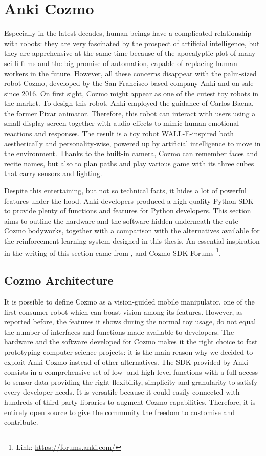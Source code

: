 \section{Anki Cozmo}

Especially in the latest decades, human beings have a complicated relationship with robots: they are very fascinated by the prospect of artificial intelligence, but they are apprehensive at the same time because of the apocalyptic plot of many sci-fi films and the big promise of automation, capable of replacing human workers in the future.
However, all these concerns disappear with the palm-sized robot Cozmo, developed by the San Francisco-based company Anki and on sale since 2016.
On first sight, Cozmo might appear as one of the cutest toy robots in the market. To design this robot, Anki employed the guidance of Carlos Baena, the former Pixar animator. 
Therefore, this robot can interact with users using a small display screen together with audio effects to mimic human emotional reactions and responses.
The result is a toy robot WALL-E-inspired both aesthetically and personality-wise, powered up by artificial intelligence to move in the environment. Thanks to the built-in camera, Cozmo can remember faces and recite names, but also to plan paths and play various game with its three cubes that carry sensors and lighting.

Despite this entertaining, but not so technical facts, it hides a lot of powerful features under the hood. Anki developers produced a high-quality Python SDK to provide plenty of functions and features for Python developers. 
This section aims to outline the hardware and the software hidden underneath the cute Cozmo bodyworks, together with a comparison with the alternatives available for the reinforcement learning system designed in this thesis. An essential inspiration in the writing of this section came from \cite{mellon2017cognitive}, \cite{touretzky2018cozmopedia} and Cozmo SDK Forums \footnote{Link: \href{https://forums.anki.com/}{https://forums.anki.com/}}.

\subsection{Cozmo Architecture}

It is possible to define Cozmo as a vision-guided mobile manipulator, one of the first consumer robot which can boast vision among its features. However, as reported before, the features it shows during the normal toy usage, do not equal the number of interfaces and functions made available to developers. The hardware and the software developed for Cozmo makes it the right choice to fast prototyping computer science projects: it is the main reason why we decided to exploit Anki Cozmo instead of other alternatives.
The SDK provided by Anki consists in a comprehensive set of low- and high-level functions with a full access to sensor data providing the right flexibility, simplicity and granularity to satisfy every developer needs. It is versatile because it could easily connected with hundreds of third-party libraries to augment Cozmo capabilities. Therefore, it is entirely open source to give the community the freedom to customise and contribute.

